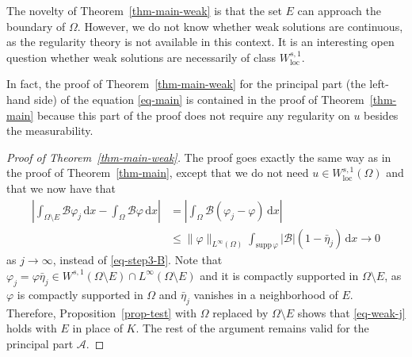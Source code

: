 \documentclass{amsart}
\theoremstyle{plain}
\theoremstyle{definition}
\numberwithin{equation}{section}
\begin{document}
The novelty of Theorem~\ref{thm-main-weak} is that the set $E$ can approach the boundary of $\Omega$. However, we do not know whether weak solutions are continuous, as the regularity theory is not available in this context. It is an interesting open question whether weak solutions are necessarily of class $W^{s, 1}_{\mathrm{loc}}$.

In fact, the proof of Theorem~\ref{thm-main-weak} for  the principal part (the left-hand side) of the equation \eqref{eq-main} is contained in the proof of Theorem~\ref{thm-main} because this part of the proof does not require any regularity on $u$ besides the measurability.

\begin{proof}[Proof of Theorem~\ref{thm-main-weak}]
The proof goes exactly the same way as in the proof of Theorem~\ref{thm-main}, except that we do not need $u \in W^{s, 1}_{\mathrm{loc}}(\Omega)$ and that we now have that
\begin{align*}
\left| \int_{\Omega \setminus E} \mathscr{B}\varphi_j \,\mathrm{d}x - \int_{\Omega} \mathscr{B} \varphi \,\mathrm{d}x \right|
&= \left| \int_{\Omega} \mathscr{B}(\varphi_j-\varphi) \,\mathrm{d}x \right| \\
&\leq \|\varphi\|_{L^\infty(\Omega)} \int_{\mathrm{supp}\,\varphi} |\mathscr{B}| (1-\bar{\eta}_j) \,\mathrm{d}x \to 0
\end{align*}
as $j \to \infty$, instead of \eqref{eq-step3-B}. Note that $\varphi_j=\varphi \bar{\eta}_j \in W^{s, 1}(\Omega \setminus E) \cap L^\infty(\Omega \setminus E)$ and it is compactly supported in $\Omega \setminus E$, as $\varphi$ is compactly supported in $\Omega$ and $\bar{\eta}_j$ vanishes in a neighborhood of $E$. Therefore, Proposition~\ref{prop-test} with $\Omega$ replaced by $\Omega \setminus E$ shows that \eqref{eq-weak-j} holds with $E$ in place of $K$. The rest of the argument remains valid for the principal part $\mathscr{A}$.
\end{proof}
\end{document}
